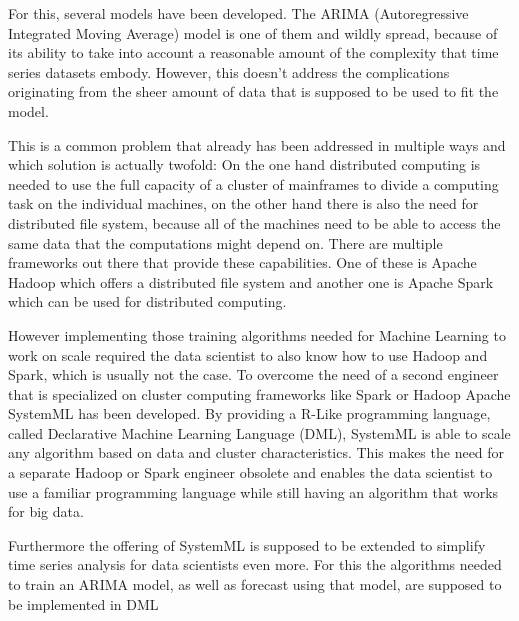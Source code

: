 For this, several models have been developed. The \acs{ARIMA} (Autoregressive Integrated Moving Average) model is one of them and wildly spread, because of its ability to take into account a reasonable amount of the complexity that time series datasets embody. However, this doesn't address the complications originating from the sheer amount of data that is supposed to be used to fit the model.

This is a common problem that already has been addressed in multiple ways and which solution is actually twofold: On the one hand distributed computing is needed to use the full capacity of a cluster of mainframes to divide a computing task on the individual machines, on the other hand there is also the need for distributed file system, because all of the machines need to be able to access the same data that the computations might depend on. There are multiple frameworks out there that provide these capabilities. One of these is Apache Hadoop which offers a distributed file system and another one is Apache Spark which can be used for distributed computing.

However implementing those training algorithms needed for Machine Learning to work on scale required the data scientist to also know how to use Hadoop and Spark, which is usually not the case. To overcome the need of a second engineer that is specialized on cluster computing frameworks like Spark or Hadoop Apache SystemML has been developed. By providing a R-Like programming language, called Declarative Machine Learning Language (\acs{DML}), SystemML is able to scale any algorithm based on data and cluster characteristics. This makes the need for a separate Hadoop or Spark engineer obsolete and enables the data scientist to use a familiar programming language while still having an algorithm that works for big data.

Furthermore the offering of SystemML is supposed to be extended to simplify time series analysis for data scientists even more. For this the algorithms needed to train an \acs{ARIMA} model, as well as forecast using that model, are supposed to be implemented in DML
 








